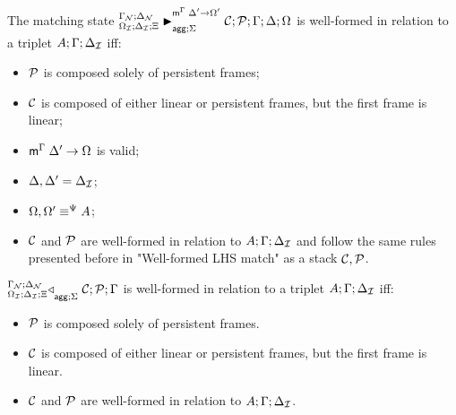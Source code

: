 \begin{definition}

The matching state $\matstatea{\deltan}{\lstack{C};
\lstack{P}}{\Gamma}{\Delta}{\Omega}{\Delta' \rightarrow \Omega'}{\Sigma}$ is
well-formed in relation to a triplet $A; \Gamma; \deltan$ iff:

\begin{itemize}[leftmargin=*]

   \item $\lstack{P}$ is composed solely of persistent frames;

   \item $\lstack{C}$ is composed of either linear or persistent frames, but the
      first frame is linear;

   \item $\mz{\Gamma}{\Delta'}{\Omega}$ is valid;

   \item $\Delta, \Delta' = \deltan$;
   \item $\feqa{\Omega, \Omega'}{A}{\Psi}{\Psi}$;
   \item $\lstack{C}$ and $\lstack{P}$ are well-formed in relation to $A; \Gamma; \deltan$ and
   follow the same rules presented before in "Well-formed LHS match" as a stack
   $\lstack{C}, \lstack{P}$.
\end{itemize}
\end{definition}


\begin{definition}

$\contstatea{\deltan}{\lstack{C} ; \lstack{P}}{\Gamma}{\Sigma}$ is well-formed
in relation to a triplet $A; \Gamma; \deltan$ iff:

\begin{itemize}[leftmargin=*]

   \item $\lstack{P}$ is composed solely of persistent frames.

   \item $\lstack{C}$ is composed of either linear or persistent frames, but the
      first frame is linear.

   \item $\lstack{C}$ and $\lstack{P}$ are well-formed in relation to $A; \Gamma; \deltan$.

\end{itemize}
\end{definition}

